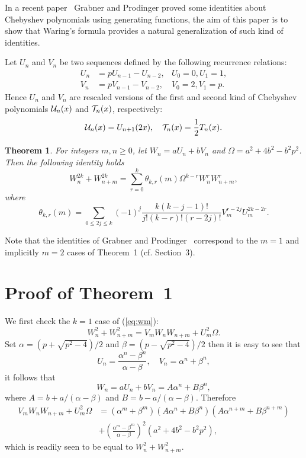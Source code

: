 \documentclass[12pt]{article}
\newtheorem{thm}{Theorem}
\begin{document}
In a recent paper~\cite{GP} Grabner and Prodinger proved some
identities about Chebyshev polynomials using generating functions,
the aim of this paper is to show that Waring's formula provides
a natural generalization of such kind of identities.

Let $U_n$ and $V_n$ be two
sequences defined by the following recurrence relations:
\begin{align}
U_n&=pU_{n-1}-U_{n-2},&U_0=0, U_1=1,\\
V_n&=pV_{n-1}-V_{n-2},&V_0=2, V_1=p.
\end{align}
Hence $U_n$ and $V_n$ are rescaled versions of the first and
second kind of Chebyshev polynomials ${\cal U}_n(x)$ and ${\cal
T}_n(x)$, respectively:
$$
{\cal U}_n(x)=U_{n+1}(2x),\quad {\cal T}_n(x)=\frac{1}{2}T_n(x).
$$
\begin{thm} For integers
$m,n\geq 0$, let $W_n=aU_n+bV_n$ and  $\Omega=a^2+4b^2-b^2p^2$. Then the following identity holds
\begin{equation}\label{eq:wm}
W_n^{2k}+W_{n+m}^{2k}=\sum_{r=0}^{k}\theta_{k,r}(m)\Omega^{k-r}W_n^rW_{n+m}^r,
\end{equation}
where
$$
\theta_{k,r}(m)=\sum_{0\leqslant 2j\leqslant
k}(-1)^j\frac{k(k-j-1)!}{j!(k-r)!(r-2j)!}V_m^{r-2j}U_m^{2k-2r}.
$$
\end{thm}
Note that  the identities of Grabner and Prodinger~\cite{GP} correspond to the $m=1$
and implicitly $m=2$ cases of Theorem~1 (cf. Section~3).
\section{Proof of Theorem~1}
We first check the $k=1$ case of (\ref{eq:wm}):
\begin{equation}\label{fund}
W_n^2+W_{n+m}^2=V_mW_nW_{n+m}+U_m^2\Omega.
\end{equation}
Set $\alpha=(p+\sqrt{p^2-4})/2$ and $\beta=(p-\sqrt{p^2-4})/2$
then it is easy to see that
$$
U_n=\frac{\alpha^{n}-\beta^{n}}{\alpha-\beta},\quad
V_{n}=\alpha^n+\beta^n,
$$
it follows that
\[
W_n=aU_n+bV_n=A\alpha^n+B\beta^n,
\]
where $A=b+a/(\alpha-\beta)$ and $B=b-a/(\alpha-\beta)$. Therefore
\begin{align*}
V_mW_nW_{n+m}+U_m^2\Omega
&=(\alpha^m+\beta^m)(A\alpha^n+B\beta^n)(A\alpha^{n+m}+B\beta^{n+m})\\
&+\left(\frac{\alpha^m-\beta^m}{\alpha-\beta}\right)^2(a^2+4b^2-b^2p^2),
\end{align*}
 which is readily seen to be equal to $W_n^2+W_{n+m}^2$.
\end{document}

